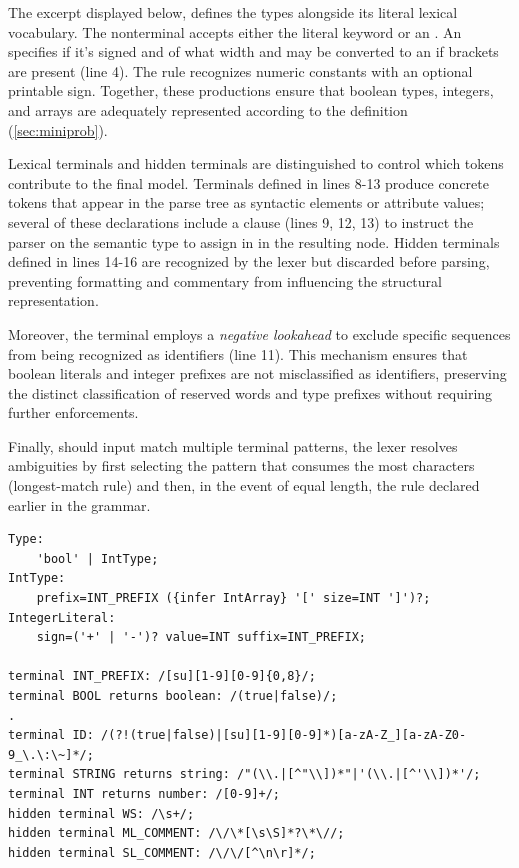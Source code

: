 The excerpt displayed below, defines the types alongside its literal lexical vocabulary. The nonterminal  accepts either the literal keyword  or an . An  specifies if it's signed and of what width and may be converted to an  if brackets are present (line 4).
The  rule recognizes numeric constants with an optional printable sign. Together, these productions ensure that boolean types, integers, and arrays are adequately represented according to the  definition (\ref{sec:miniprob}).

Lexical terminals and hidden terminals are distinguished to control which tokens contribute to the final model. Terminals defined in lines 8-13 produce concrete tokens that appear in the parse tree as syntactic elements or attribute values; several of these declarations include a  clause (lines 9, 12, 13) to instruct the parser on the semantic type to assign in
in the resulting node. Hidden terminals defined in lines 14-16 are recognized by the lexer but discarded before parsing, preventing formatting and commentary from influencing the structural representation.

Moreover, the  terminal employs a \textit{negative lookahead} to exclude specific sequences from being recognized as identifiers (line 11). This mechanism ensures that boolean literals and integer prefixes are not misclassified as identifiers, preserving the distinct classification of reserved words and type prefixes without requiring further enforcements.

Finally, should input match multiple terminal patterns, the lexer resolves ambiguities by first selecting the pattern that consumes the most characters (longest-match rule) and then, in the event of equal length, the rule declared earlier in the grammar.

\begin{verbatim}
Type:
    'bool' | IntType;
IntType:
    prefix=INT_PREFIX ({infer IntArray} '[' size=INT ']')?;
IntegerLiteral:
    sign=('+' | '-')? value=INT suffix=INT_PREFIX;

terminal INT_PREFIX: /[su][1-9][0-9]{0,8}/;
terminal BOOL returns boolean: /(true|false)/;
.
terminal ID: /(?!(true|false)|[su][1-9][0-9]*)[a-zA-Z_][a-zA-Z0-9_\.\:\~]*/;
terminal STRING returns string: /"(\\.|[^"\\])*"|'(\\.|[^'\\])*'/;
terminal INT returns number: /[0-9]+/;
hidden terminal WS: /\s+/;
hidden terminal ML_COMMENT: /\/\*[\s\S]*?\*\//;
hidden terminal SL_COMMENT: /\/\/[^\n\r]*/;
\end{verbatim}
\vspace{0.5em}

